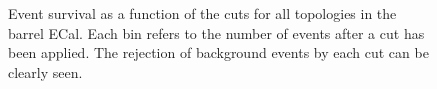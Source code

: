 \begin{figure}
\begin{minipage}{.5\linewidth}
\end{minipage}%
\begin{minipage}{.5\linewidth}
\centering
{}
\end{minipage}\par\medskip
\caption{Event survival as a function of the cuts for all topologies in the barrel ECal.  Each bin refers to the number of events after a cut has been applied.  The rejection of background events by each cut can be clearly seen.}
\label{fig:SelEventSurvivalBarrel}
\end{figure}
